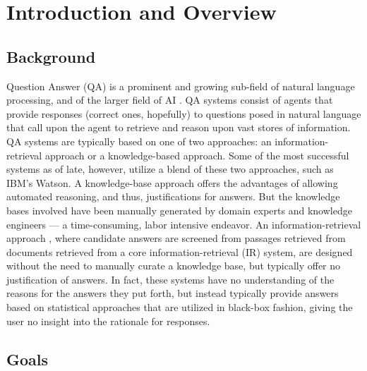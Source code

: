  
\chapter{Introduction and Overview}

\section{Background}
Question Answer (QA) \cite{radev2000ranking} is a prominent and growing sub-field of natural language processing, and of the larger
field of AI \cite{russell_norvig_2010_ch1}.  QA systems \cite{radev2000ranking} consist of agents that provide responses (correct ones, hopefully) to questions posed in natural language that call upon the agent to retrieve and reason upon vast stores of information.  QA systems are typically based on one of two approaches: an
information-retrieval \cite{manning2008introduction} approach or a knowledge-based \cite{brachman2004knowledge} approach.  Some of the most successful systems
as of late, however, utilize a blend of these two approaches, such as IBM's Watson.  A knowledge-base \cite{brachman2004knowledge} 
approach offers the advantages of allowing automated reasoning, and thus, justifications for answers.
But the knowledge bases involved have been manually generated by domain experts and knowledge
engineers --- a time-consuming, labor intensive endeavor.  An information-retrieval approach \cite{manning2008introduction}, where
candidate answers are screened from passages retrieved from documents retrieved from a core
information-retrieval (IR) system, are designed without the need to manually curate a knowledge
base, but typically offer no justification of answers.  In fact, these systems have no understanding
of the reasons for the answers they put forth, but instead typically provide answers based on statistical approaches that are utilized in black-box fashion, giving the user no insight into the rationale for 
responses.



\section{Goals}

